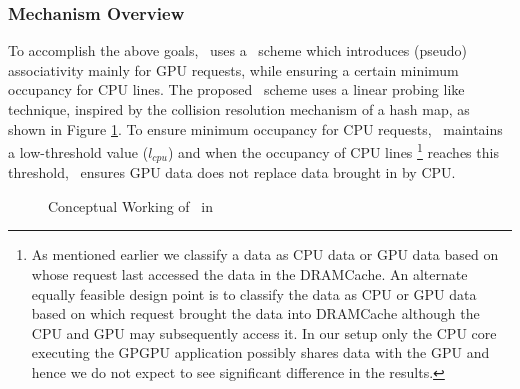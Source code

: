 \subsubsection{Mechanism Overview}
\par To accomplish the above goals, \cachename\ uses a \chaining\ scheme which introduces (pseudo) associativity mainly for GPU requests, while ensuring a certain minimum occupancy for CPU lines. The proposed \chaining\ scheme uses a linear probing \cite{knuth-linear-probing} like technique, inspired by the collision resolution mechanism of a hash map, as shown in Figure \ref{fig:chaining-concept}.
To ensure minimum occupancy for CPU requests, \chaining\ maintains a low-threshold value (\textit{$l_{cpu}$}) and when the occupancy of CPU lines
\footnote{As mentioned earlier we classify a data as CPU data or GPU data based on whose request last accessed the data in the DRAMCache. An alternate equally feasible design point is to classify the data as CPU or GPU data based on which request brought the data into DRAMCache although the CPU and GPU may subsequently access it. In our setup only the CPU core executing the GPGPU application possibly shares data with the GPU and hence we do not expect to see significant difference in the results.} 
reaches this threshold, \chaining\ ensures GPU data does not replace data brought in by CPU. 

\begin{figure}
	\centering
	\def\svgwidth{0.45\linewidth}
	
	\caption{Conceptual Working of \chaining\ in \cachename}
	\label{fig:chaining-concept}
\end{figure}

